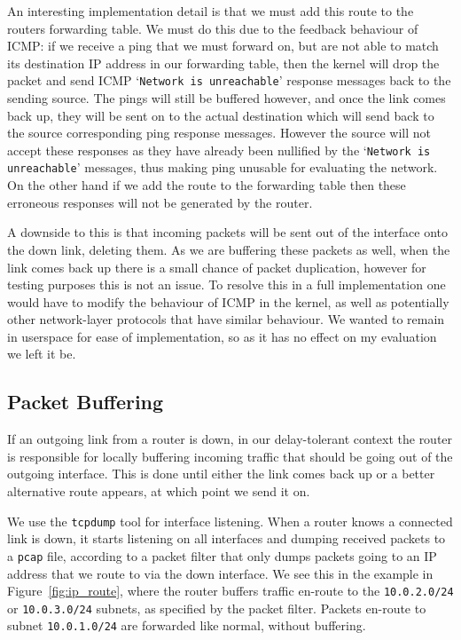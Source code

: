 \documentclass[withindex,glossary,openany]{cam-thesis}
\begin{document}
An interesting implementation detail is that we must add this route to the routers forwarding table. We must do this due to the feedback behaviour of ICMP: if we receive a ping that we must forward on, but are not able to match its destination IP address in our forwarding table, then the kernel will drop the packet and send ICMP `\texttt{Network is unreachable}' response messages back to the sending source. The pings will still be buffered however, and once the link comes back up, they will be sent on to the actual destination which will send back to the source corresponding ping response messages. However the source will not accept these responses as they have already been nullified by the `\texttt{Network is unreachable}' messages, thus making ping unusable for evaluating the network. On the other hand if we add the route to the forwarding table then these erroneous responses will not be generated by the router.

A downside to this is that incoming packets will be sent out of the interface onto the down link, deleting them. As we are buffering these packets as well, when the link comes back up there is a small chance of packet duplication, however for testing purposes this is not an issue. To resolve this in a full implementation one would have to modify the behaviour of ICMP in the kernel, as well as potentially other network-layer protocols that have similar behaviour. We wanted to remain in userspace for ease of implementation, so as it has no effect on my evaluation we left it be.


\subsection{Packet Buffering}

If an outgoing link from a router is down, in our delay-tolerant context the router is responsible for locally buffering incoming traffic that should be going out of the outgoing interface. This is done until either the link comes back up or a better alternative route appears, at which point we send it on.

We use the \texttt{tcpdump} tool for interface listening. When a router knows a connected link is down, it starts listening on all interfaces and dumping received packets to a \texttt{pcap} file, according to a packet filter that only dumps packets going to an IP address that we route to via the down interface. We see this in the example in Figure~\ref{fig:ip_route}, where the router buffers traffic en-route to the \texttt{10.0.2.0/24} or \texttt{10.0.3.0/24} subnets, as specified by the packet filter. Packets en-route to subnet \texttt{10.0.1.0/24} are forwarded like normal, without buffering.
\end{document}
